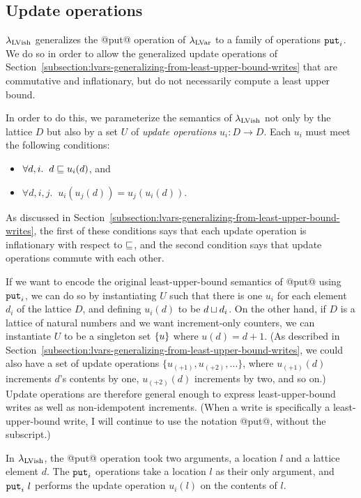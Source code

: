 \subsection{Update operations}\label{subsection:quasi-update-operations}

$\lambda_{\textrm{LVish}}$ generalizes the @put@ operation of $\lambda_{\textrm{LVar}}$ to a
family of operations $\mbox{\texttt{put}}_i$.  We do so in order to allow the
generalized update operations of
Section~\ref{subsection:lvars-generalizing-from-least-upper-bound-writes}
that are commutative and inflationary, but do not necessarily compute
a least upper bound.

In order to do this, we parameterize the semantics of $\lambda_{\textrm{LVish}}$
not only by the lattice $D$ but also by a set $U$ of \emph{update
  operations} $u_i : D \rightarrow D$.  Each $u_i$ must meet the
following conditions:
\begin{itemize}
\item $\forall d, i.     \;\; d \sqsubseteq u_i(d)$, and
\item $\forall d, i, j.  \;\; u_i(u_j(d)) = u_j(u_i(d))$.
\end{itemize}
As discussed in
Section~\ref{subsection:lvars-generalizing-from-least-upper-bound-writes},
the first of these conditions says that each update operation is
inflationary with respect to $\sqsubseteq$, and the second condition says
that update operations commute with each other.

If we want to encode the original least-upper-bound semantics of @put@
using $\mbox{\texttt{put}}_i$, we can do so by instantiating $U$ such that there is
one $u_i$ for each element $d_i$ of the lattice $D$, and defining
$u_i(d)$ to be $d \sqcup d_i$.  On the other hand, if $D$ is a
lattice of natural numbers and we want increment-only counters, we can
instantiate $U$ to be a singleton set $\left\{ u \right\}$ where $u(d) = d +
1$.  (As described in
Section~\ref{subsection:lvars-generalizing-from-least-upper-bound-writes},
we could also have a set of update operations $\{ u_{(+1)}, u_{(+2)},
\dots \}$, where $u_{(+1)}(d)$ increments $d$'s contents by one,
$u_{(+2)}(d)$ increments by two, and so on.) Update operations are
therefore general enough to express least-upper-bound writes as well
as non-idempotent increments.  (When a write is specifically a
least-upper-bound write, I will continue to use the notation @put@,
without the subscript.)

In $\lambda_{\textrm{LVish}}$, the @put@ operation took two arguments, a location
$l$ and a lattice element $d$.  The $\mbox{\texttt{put}}_i$ operations take a location
$l$ as their only argument, and $\mbox{\texttt{put}}_i~l$ performs the update
operation $u_i(l)$ on the contents of $l$.

